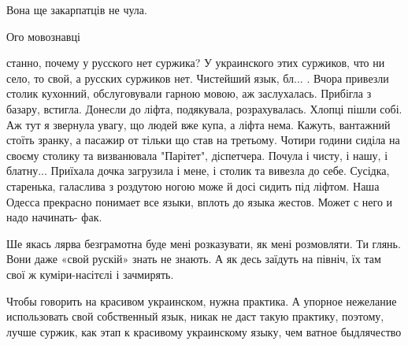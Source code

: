  
Вона ще закарпатців не чула.

 
Ого мовознавці


станно, почему у русского нет суржика? У украинского этих суржиков, что ни
село, то свой, а русских суржиков нет. Чистейший язык, бл... . Вчора привезли
столик кухонний, обслуговували гарною мовою, аж заслухалась. Прибігла з базару,
встигла. Донесли до ліфта, подякувала, розрахувалась. Хлопці пішли собі. Аж тут
я звернула увагу, що людей вже купа, а ліфта нема. Кажуть, вантажний стоїть
зранку, а пасажир от тільки що став на третьому. Чотири години сиділа на своєму
столику та визванювала "Парітет", діспетчера. Почула і чисту, і нашу, і
блатну... Приїхала дочка загрузила і мене, і столик та вивезла до себе.
Сусідка, старенька, галаслива з роздутою ногою може й досі сидить під ліфтом.
Наша Одесса прекрасно понимает все языки, вплоть до языка жестов. Может с него
и надо начинать- фак.


Ше якась лярва безграмотна буде мені розказувати, як мені розмовляти. Ти глянь.
Вони даже «свой рускій» знать не знають. А як десь заїдуть на північ, їх там
свої ж куміри-насітєлі і зачмирять.

 

Чтобы говорить на красивом украинском, нужна практика. А упорное нежелание
использовать свой собственный язык, никак не даст такую практику, поэтому,
лучше суржик, как этап к красивому украинскому языку, чем ватное быдлячество


